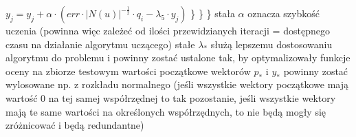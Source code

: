 \documentclass{pracamgr}
\begin{document}
    \hspace*{64pt}				$y_j=y_j+\alpha\cdot(err\cdot |N(u)|^{-\frac{1}{2}}\cdot q_i-\lambda_5\cdot y_j)$\newline
    \hspace*{48pt}			\}\newline
    \hspace*{32pt}		\}\newline
    \hspace*{16pt}	\}\newline
     {\scriptsize
      stała $\alpha$ oznacza szybkość uczenia (powinna więc zależeć od ilości przewidzianych iteracji = dostępnego czasu na działanie algorytmu uczącego)\newline
      stałe $\lambda_*$ służą lepszemu dostosowaniu algorytmu do problemu i powinny zostać ustalone tak, by optymalizowały funkcje oceny na zbiorze testowym\newline
      wartości początkowe wektorów $p_*$ i $y_*$ powinny zostać wylosowane np. z rozkładu normalnego
      (jeśli wszystkie wektory początkowe mają wartość $0$ na tej samej współrzędnej to tak pozostanie,
      jeśli wszystkie wektory mają te same wartości na określonych współrzędnych, to nie będą mogły się zróżnicować i będą redundantne)
     }\newline

     
  
\end{document}
